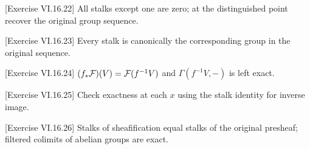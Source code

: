 \begin{hint}
[Exercise VI.16.22]
All stalks except one are zero; at the distinguished point recover the original group sequence.
\end{hint}

\begin{hint}
[Exercise VI.16.23]
Every stalk is canonically the corresponding group in the original sequence.
\end{hint}

\begin{hint}
[Exercise VI.16.24]
$(f_*\mathcal F)(V)=\mathcal F(f^{-1}V)$ and $\Gamma(f^{-1}V,-)$ is left exact.
\end{hint}

\begin{hint}
[Exercise VI.16.25]
Check exactness at each $x$ using the stalk identity for inverse image.
\end{hint}

\begin{hint}
[Exercise VI.16.26]
Stalks of sheafification equal stalks of the original presheaf; filtered colimits of abelian groups are exact.
\end{hint}
